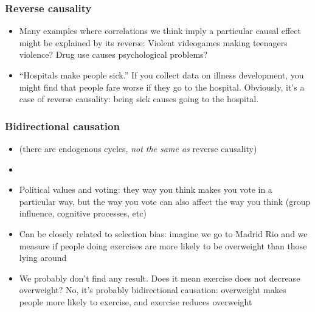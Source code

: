 \documentclass[aspectratio=43]{beamer}
\begin{document}
\begin{frame}
\frametitle{Reverse causality}\label{reverse}
\centering

\begin{itemize}
  \item Many examples where correlations we think imply a particular causal effect might be explained by its reverse: Violent videogames making teenagers violence? Drug use causes psychological problems?
  \item ``Hospitals make people sick.'' If you collect data on illness development, you might find that people fare worse if they go to the hospital. Obviously, it's a case of reverse causality: being sick causes going to the hospital.
\end{itemize}

\end{frame}

\begin{frame}
\frametitle{Bidirectional causation}\label{bidirect}
\centering


\begin{itemize}
  \item (there are endogenous cycles, \textit{not the same as} reverse causality)
  \item[]
  \item Political values and voting: they way you think makes you vote in a particular way, but the way you vote can also affect the way you think (group influence, cognitive processes, etc)
  \item Can be closely related to selection bias: imagine we go to Madrid Rio and we measure if people doing exercises are more likely to be overweight than those lying around
  \item We probably don't find any result. Does it mean exercise does not decrease overweight? No, it's probably bidirectional causation: overweight makes people more likely to exercise, and exercise reduces overweight
\end{itemize}

\end{frame}
\end{document}
